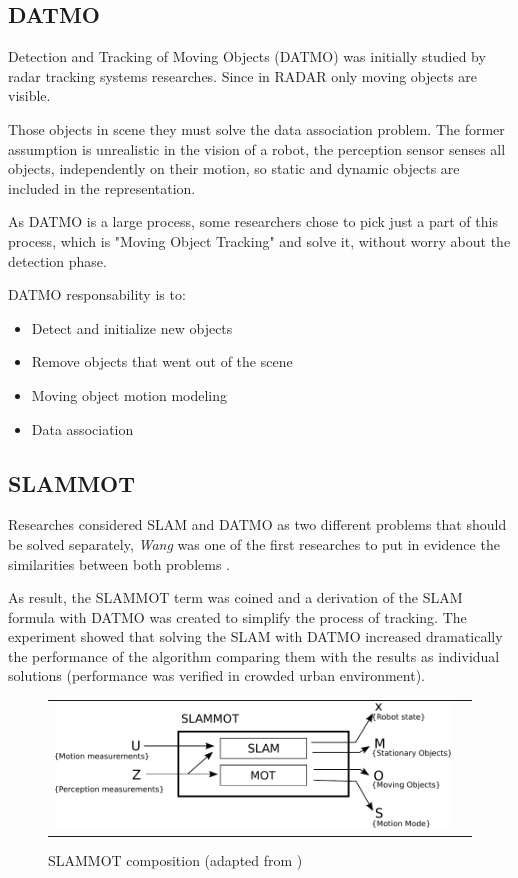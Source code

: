 \subsection{DATMO}

Detection and Tracking of Moving Objects (DATMO) was initially studied by radar tracking systems \cite{VU-2009-454238} researches. Since in RADAR only moving objects are visible.

Those objects in scene they must solve the data association problem. The former assumption is unrealistic in the vision of a robot, the perception sensor senses all objects, independently on their motion, so static and dynamic objects are included in the representation.

As DATMO is a large process, some researchers chose to pick just a part of this process, which is "Moving Object Tracking" and solve it, without worry about the detection phase.

DATMO responsability is to:

\begin{itemize}
\item Detect and initialize new objects
\item Remove objects that went out of the scene
\item Moving object motion modeling
\item Data association
\end{itemize}

\subsection{SLAMMOT}

Researches considered SLAM and DATMO as two different problems that should be solved separately, \textit{Wang} was one of the first researches to put in evidence the similarities between both problems \cite{Wang03onlinesimultaneous}.

As result, the SLAMMOT term was coined and a derivation of the SLAM formula with DATMO was created to simplify the process of tracking. The experiment showed that solving the SLAM with DATMO increased dramatically the performance of the algorithm comparing them with the results as individual solutions (performance was verified in crowded urban environment).

\begin{figure}[h]
   \centering
     \begin{tabular}{lr}
       \includegraphics[scale=0.9]{img/fig:slammot}
     \end{tabular}
   \caption{SLAMMOT composition (adapted from \cite{Wang04a})}
   \label{fig:slammot}
 \end{figure}


